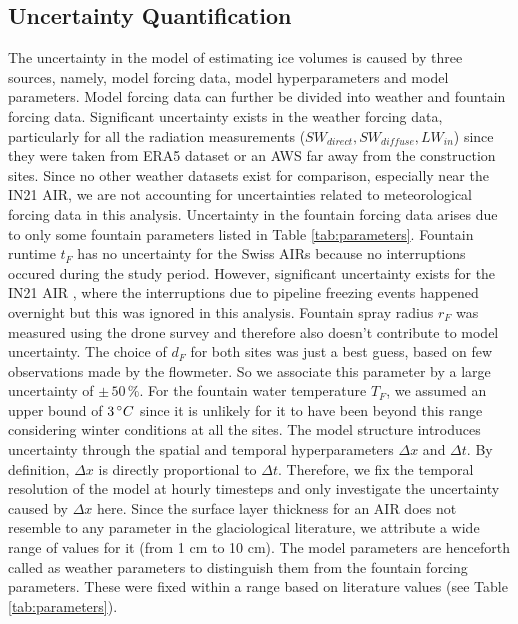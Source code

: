 \documentclass[utf8]{frontiersSCNS}
\begin{document}
\subsection{Uncertainty Quantification}

The uncertainty in the model of estimating ice volumes is caused by three sources, namely, model forcing
data, model hyperparameters and model parameters. Model forcing data can further be divided into weather and
fountain forcing data. Significant uncertainty exists in the weather forcing data, particularly for all the
radiation measurements ($SW_{direct}, SW_{diffuse}, LW_{in}$) since they were taken from ERA5 dataset or an AWS
far away from the construction sites. Since no other weather datasets exist for comparison, especially near the
IN21 AIR, we are not accounting for uncertainties related to meteorological forcing data in this analysis.
Uncertainty in the fountain forcing data arises due to only some fountain parameters listed in Table
\ref{tab:parameters}. Fountain runtime $t_F$ has no uncertainty for the Swiss AIRs because no interruptions
occured during the study period. However, significant uncertainty exists for the IN21 AIR , where the
interruptions due to pipeline freezing events happened overnight but this was ignored in this analysis. Fountain
spray radius $r_F$ was measured using the drone survey and therefore also doesn't contribute to model
uncertainty. The choice of $d_F$ for both sites was just a best guess, based on few observations made by the
flowmeter. So we associate this parameter by a large uncertainty of $\pm \,50\, \%$. For the fountain water
temperature $T_F$, we assumed an upper bound of $3\, \degree C$ since it is unlikely for it to have been beyond
this range considering winter conditions at all the sites. The model structure introduces uncertainty through
the spatial and temporal hyperparameters $\Delta x$ and $\Delta t$. By definition, $\Delta x$ is directly
proportional to $\Delta t$. Therefore, we fix the temporal resolution of the model at hourly timesteps and only
investigate the uncertainty caused by $\Delta x$ here. Since the surface layer thickness for an AIR does not
resemble to any parameter in the glaciological literature, we attribute a wide range of values for it (from 1 cm
to 10 cm). The model parameters are henceforth called as weather parameters to distinguish them from the
fountain forcing parameters. These were fixed within a range based on literature values (see Table
\ref{tab:parameters}). 
\end{document}
